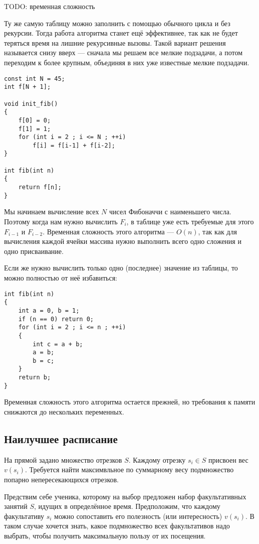 \documentclass[14pt]{book}
\begin{document}
TODO: временная сложность

Ту же самую таблицу можно заполнить с помощью обычного цикла и без рекурсии.
Тогда работа алгоритма станет ещё эффективнее, так как не будет теряться время на
лишние рекурсивные вызовы.
Такой вариант решения называется снизу вверх --- сначала мы решаем все мелкие подзадачи,
а потом переходим к более крупным, объединяя в них уже известные мелкие подзадачи.

\begin{lstlisting}
const int N = 45;
int f[N + 1];

void init_fib()
{
    f[0] = 0;
    f[1] = 1;
    for (int i = 2 ; i <= N ; ++i)
        f[i] = f[i-1] + f[i-2];
}

int fib(int n)
{
    return f[n];
}
\end{lstlisting}

Мы начинаем вычисление всех $N$ чисел Фибоначчи с наименьшего числа. Поэтому когда нам
нужно вычислить $F_i$, в таблице уже есть требуемые для этого $F_{i-1}$ и $F_{i-2}$.
Временная сложность этого алгоритма --- $O(n)$, так как для вычисления каждой ячейки
массива нужно выполнить всего одно сложения и одно присваивание.

Если же нужно вычислить только одно (последнее) значение из таблицы, то можно полностью
от неё избавиться:

\begin{lstlisting}
int fib(int n)
{
    int a = 0, b = 1;
    if (n == 0) return 0;
    for (int i = 2 ; i <= n ; ++i)
    {
        int c = a + b;
        a = b;
        b = c;
    }
    return b;
}
\end{lstlisting}

Временная сложность этого алгоритма остается прежней, но требования к памяти снижаются
до нескольких переменных.

\subsection{Наилучшее расписание}

На прямой задано множество отрезков $S$. Каждому отрезку $s_i \in S$ присвоен вес $v(s_i)$.
Требуется найти максимвльное по суммарному весу подмножество попарно непересекающихся отрезков.

Предствим себе ученика, которому на выбор предложен набор факультативных занятий $S$, идущих
в определённое время. Предположим, что каждому факультативу $s_i$ можно сопоставить
его полезность (или интересность) $v(s_i)$. В таком случае хочется знать, какое подмножество
всех факультативов надо выбрать, чтобы получить максимальную пользу от их посещения.
\end{document}
